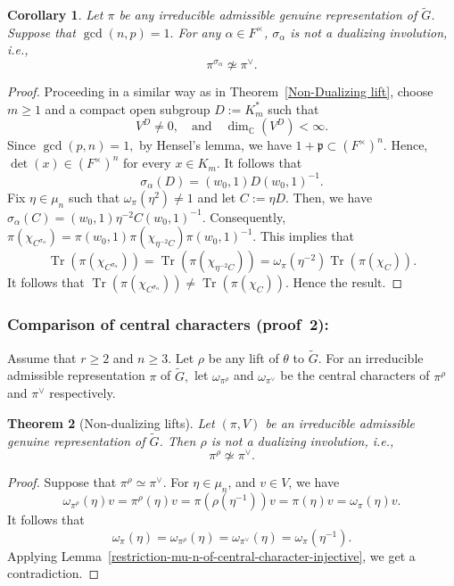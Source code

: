 \documentclass[11pt, a4paper, reqno]{amsart}
\newtheorem{theorem}{Theorem}[section]
\newtheorem{corollary}[theorem]{Corollary}
\theoremstyle{definition}
\theoremstyle{remark}
\theoremstyle{example}
\theoremstyle{note}
\numberwithin{equation}{section}
\DeclareMathOperator{\tr}{Tr}
\begin{document}
\begin{corollary}\label{lifts of tau is not dualizing}
 Let $\pi$ be any irreducible admissible genuine representation of $\widetilde{G}$. Suppose that $\gcd(n,p)=1.$ For any $\alpha \in F^{\times}$, $\sigma_\alpha$ is not a dualizing involution, i.e.,
\[\pi^{\sigma_{\alpha}}\not\simeq \pi^{\vee}. \]
\end{corollary}

\begin{proof}  
Proceeding in a similar way as in  Theorem~\ref{Non-Dualizing lift}, choose $m\geq 1$ and a compact open subgroup $D:=K_{m}^{*}$ such that  \[ V^{D}\neq 0, \quad \text{and}  \quad \dim_{\mathbb{C}}(V^{D})<\infty. \] Since $\gcd(p,n)=1,$ by Hensel's lemma, we have $1+ \mathfrak{p} \subset (F^{\times})^{n}.$ Hence, $\det(x) \in (F^{\times})^{n}$ for every $x \in K_m.$ It follows that $$\sigma_{\alpha}(D) = (w_0, 1) D (w_0, 1)^{-1}.$$ Fix $\eta\in\mu_{n}$ such that $\omega_\pi(\eta^2)\neq1$ and let $C:=\eta D$. Then, we have $\sigma_\alpha(C)=(w_{0},1) \eta^{-2}C (w_{0},1)^{-1}$. Consequently, $\pi(\chi_{C^{\sigma_\alpha}}) = \pi(w_0, 1) \pi(\chi_{\eta^{-2}C}) \pi(w_0, 1)^{-1}.$ This implies that $$\tr(\pi(\chi_{C^{\sigma_\alpha}}))=\tr(\pi(\chi_{\eta^{-2}C})) =\omega_\pi(\eta^{-2}) \tr(\pi(\chi_C)).$$ 
It follows that $\tr(\pi(\chi_{C^{\sigma_\alpha}}))\neq \tr(\pi(\chi_C)).$ Hence the result.
\end{proof}


\subsubsection{Comparison of central characters (proof~2):} Assume that $r\geq 2$ and $n\geq 3$. Let $\rho$ be any lift of $\theta$ to $\widetilde{G}$. For an irreducible admissible  representation $\pi$ of $\widetilde{G},$ let $\omega_{\pi^{\rho}}$ and $\omega_{\pi^{\vee}}$ be the central characters of $\pi^{\rho}$ and $\pi^{\vee}$ respectively. 
\begin{theorem}[Non-dualizing lifts]\label{thm:non-dualizing-lifts}
Let $(\pi,V)$ be an irreducible admissible genuine representation of $\widetilde{G}$. Then $\rho$ is not a dualizing involution, i.e., 
\[\pi^{\rho}\not\simeq \pi^{\vee}.
\]
\end{theorem}
\begin{proof} Suppose that $\pi^{\rho}\simeq \pi^{\vee}$. For $\eta\in \mu_{n}$, and $v\in V$, we have 
\begin{equation*}
    \omega_{\pi^{\rho}}(\eta)v= \pi^\rho(\eta)v
    =\pi\left(\rho\left(\eta^{-1}\right)\right)v
    =\pi(\eta)v
    =\omega_{\pi}(\eta)v.
\end{equation*}
It follows that  
$$\omega_{\pi}(\eta)= \omega_{\pi^{\rho}}(\eta)=\omega_{\pi^{\vee}}(\eta)=\omega_{\pi}(\eta^{-1}).$$
Applying Lemma~\ref{restriction-mu-n-of-central-character-injective}, we get a contradiction. 
\end{proof}
\end{document}
